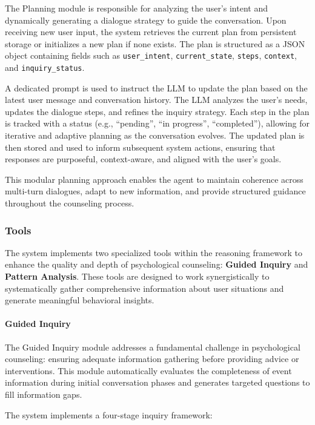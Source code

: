 The Planning module is responsible for analyzing the user's intent and dynamically generating a dialogue strategy to guide the conversation. Upon receiving new user input, the system retrieves the current plan from persistent storage or initializes a new plan if none exists. The plan is structured as a JSON object containing fields such as \texttt{user\_intent}, \texttt{current\_state}, \texttt{steps}, \texttt{context}, and \texttt{inquiry\_status}. 

A dedicated prompt is used to instruct the LLM to update the plan based on the latest user message and conversation history. The LLM analyzes the user's needs, updates the dialogue steps, and refines the inquiry strategy. Each step in the plan is tracked with a status (e.g., ``pending'', ``in progress'', ``completed''), allowing for iterative and adaptive planning as the conversation evolves. The updated plan is then stored and used to inform subsequent system actions, ensuring that responses are purposeful, context-aware, and aligned with the user's goals.

This modular planning approach enables the agent to maintain coherence across multi-turn dialogues, adapt to new information, and provide structured guidance throughout the counseling process.

\subsubsection{Tools}

The system implements two specialized tools within the reasoning framework to enhance the quality and depth of psychological counseling: \textbf{Guided Inquiry} and \textbf{Pattern Analysis}. These tools are designed to work synergistically to systematically gather comprehensive information about user situations and generate meaningful behavioral insights.

\paragraph{Guided Inquiry}

The Guided Inquiry module addresses a fundamental challenge in psychological counseling: ensuring adequate information gathering before providing advice or interventions. This module automatically evaluates the completeness of event information during initial conversation phases and generates targeted questions to fill information gaps.

The system implements a four-stage inquiry framework:

